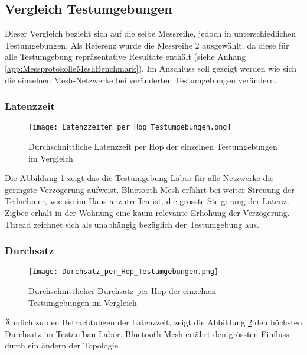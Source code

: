 \subsection{Vergleich Testumgebungen}\label{subsec:VergleichTestumgebungen}

Dieser Vergleich bezieht sich auf die selbe Messreihe, jedoch in unterschiedlichen Testumgebungen. Als Referenz wurde die Messreihe 2 ausgewählt, da diese für alle Testumgebung repräsentative Resultate enthält (siehe Anhang \ref{app:MessprotokolleMeshBenchmark}). Im Anschluss soll gezeigt werden wie sich die einzelnen Mesh-Netzwerke bei veränderten Testumgebungen verändern.

\subsubsection{Latenzzeit}\label{subsec:VergleichLatenzzeitTestumgebungen}


\begin{figure}[H]
	\centering
	\texttt{[image: Latenzzeiten\_per\_Hop\_Testumgebungen.png]}
	\caption{Durchschnittliche Latenzzeit per Hop der einzelnen Testumgebungen im Vergleich}\label{fig:Latenzzeiten_per_Hop_Testumgebungen}
\end{figure}

Die Abbildung \ref{fig:Latenzzeiten_per_Hop_Testumgebungen} zeigt das die Testumgebung Labor für alle Netzwerke die geringste Verzögerung aufweist. Bluetooth-Mesh erfährt bei weiter Streuung der Teilnehmer, wie sie im Haus anzutreffen ist, die grösste Steigerung der Latenz. Zigbee erhält in der Wohnung eine kaum relevante Erhöhung der Verzögerung. Thread zeichnet sich als unabhängig bezüglich der Testumgebung aus. 

\subsubsection{Durchsatz}\label{subsec:VergleichDurchsatzTestumgebungen}


\begin{figure}[H]
	\centering
	\texttt{[image: Durchsatz\_per\_Hop\_Testumgebungen.png]}
	\caption{Durchschnittlicher Durchsatz per Hop der einzelnen Testumgebungen im Vergleich}\label{fig:Durchsätze_per_Hop_Testumgebungen}
\end{figure}

Ähnlich zu den Betrachtungen der Latenzzeit, zeigt die Abbildung \ref{fig:Durchsätze_per_Hop_Testumgebungen} den höchsten Durchsatz im Testaufbau Labor. Bluetooth-Mesh erfährt den grössten Einfluss durch ein ändern der Topologie. 

